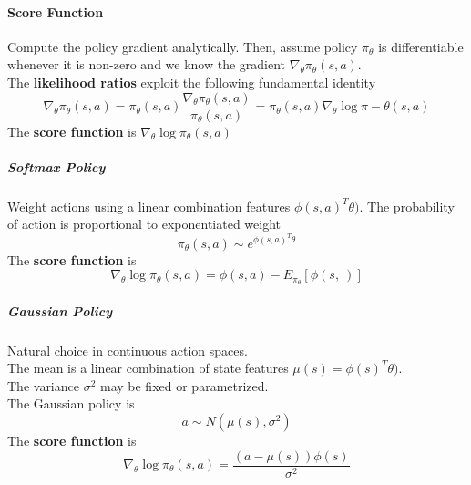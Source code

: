 \documentclass[10pt]{report}
\begin{document}
\paragraph{Score Function} Compute the policy gradient analytically. Then, assume policy $\pi_\theta$ is differentiable whenever it is non-zero and we know the gradient $\nabla_\theta\pi_\theta(s,a)$.\\
The \textbf{likelihood ratios} exploit the following fundamental identity
$$\nabla_\theta\pi_\theta(s,a)=\pi_\theta(s,a)\frac{\nabla_\theta\pi_\theta(s,a)}{\pi_\theta(s,a)} = \pi_\theta(s,a)\nabla_\theta\log\pi-\theta(s,a)$$
The \textbf{score function} is $\nabla_\theta\log\pi_\theta(s,a)$
\subparagraph{Softmax Policy} Weight actions using a linear combination features $\phi(s,a)^T\theta)$. The probability of action is proportional to exponentiated weight $$\pi_\theta(s,a)\sim e^{\phi(s,a)^T\theta}$$
The \textbf{score function} is $$\nabla_\theta\log\pi_\theta(s,a)=\phi(s,a)-E_{\pi_\theta}[\phi(s,\:)]$$
\subparagraph{Gaussian Policy} Natural choice in continuous action spaces.\\
The mean is a linear combination of state features $\mu(s) = \phi(s)^T\theta)$.\\
The variance $\sigma^2$ may be fixed or parametrized.\\
The Gaussian policy is $$a\sim N(\mu(s),\sigma^2)$$
The \textbf{score function} is $$\nabla_\theta\log\pi_\theta(s,a)=\frac{(a-\mu(s))\phi(s)}{\sigma^2}$$
\end{document}
